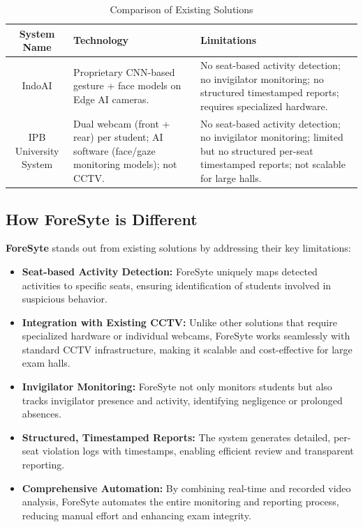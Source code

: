 \begin{table}[H]
\centering
\caption{Comparison of Existing Solutions}
\begin{tabular}{|c|p{4.5cm}|p{4.5cm}|}
\hline
\textbf{System Name}   & \textbf{Technology} & \textbf{Limitations} \\ \hline

IndoAI & 
Proprietary CNN-based gesture + face models on Edge AI cameras. & 
No seat-based activity detection; no invigilator monitoring; no structured timestamped reports; requires specialized hardware. \\ \hline

IPB University System & 
Dual webcam (front + rear) per student; AI software (face/gaze monitoring models); not CCTV. & 
No seat-based activity detection; no invigilator monitoring; limited but no structured per-seat timestamped reports; not scalable for large halls. \\ \hline

\end{tabular}
\label{tab:system_comparison}
\end{table}

\subsection{How ForeSyte is Different}

\textbf{ForeSyte} stands out from existing solutions by addressing their key limitations:

\begin{itemize}
    \item \textbf{Seat-based Activity Detection:} ForeSyte uniquely maps detected activities to specific seats, ensuring identification of students involved in suspicious behavior.
    \item \textbf{Integration with Existing CCTV:} Unlike other solutions that require specialized hardware or individual webcams, ForeSyte works seamlessly with standard CCTV infrastructure, making it scalable and cost-effective for large exam halls.
    \item \textbf{Invigilator Monitoring:} ForeSyte not only monitors students but also tracks invigilator presence and activity, identifying negligence or prolonged absences.
    \item \textbf{Structured, Timestamped Reports:} The system generates detailed, per-seat violation logs with timestamps, enabling efficient review and transparent reporting.
    \item \textbf{Comprehensive Automation:} By combining real-time and recorded video analysis, ForeSyte automates the entire monitoring and reporting process, reducing manual effort and enhancing exam integrity.
\end{itemize}

